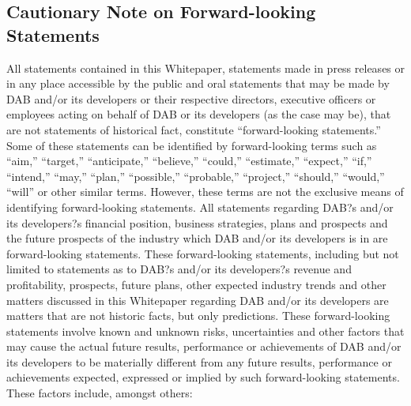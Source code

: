 \documentclass[review]{elsarticle}
\begin{document}
\subsection{Cautionary Note on Forward-looking Statements}
All statements contained in this Whitepaper, statements made in press releases or in any place accessible by the public and oral statements that may be made by DAB and/or its developers or their respective directors, executive officers or employees acting on behalf of DAB or its developers (as the case may be), that are not statements of historical fact, constitute ``forward-looking statements.'' Some of these statements can be identified by forward-looking terms such as ``aim,'' ``target,'' ``anticipate,'' ``believe,'' ``could,'' ``estimate,'' ``expect,'' ``if,'' ``intend,'' ``may,'' ``plan,'' ``possible,'' ``probable,'' ``project,'' ``should,'' ``would,'' ``will'' or other similar terms. However, these terms are not the exclusive means of identifying forward-looking statements. All statements regarding DAB?s and/or its developers?s financial position, business strategies, plans and prospects and the future prospects of the industry which DAB and/or its developers is in are forward-looking statements. These forward-looking statements, including but not limited to statements as to DAB?s and/or its developers?s revenue and profitability, prospects, future plans, other expected industry trends and other matters discussed in this Whitepaper regarding DAB and/or its developers are matters that are not historic facts, but only predictions. 
These forward-looking statements involve known and unknown risks, uncertainties and other factors that may cause the actual future results, performance or achievements of DAB and/or its developers to be materially different from any future results, performance or achievements expected, expressed or implied by such forward-looking statements. These factors include, amongst others: 
\end{document}
